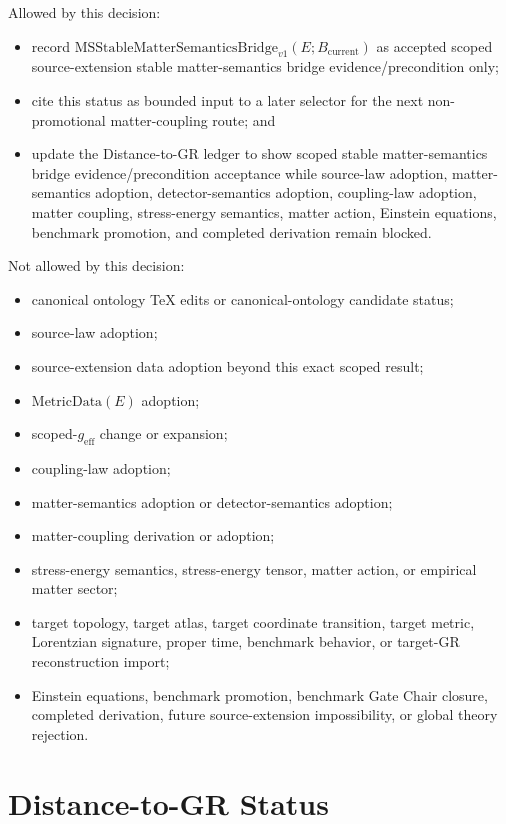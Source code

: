 \documentclass[11pt]{article}
\newcommand{\Bcur}{B_{\mathrm{current}}}
\newcommand{\MSBridge}{\mathrm{MSStableMatterSemanticsBridge}_{v1}}
\newcommand{\MetricData}{\mathrm{MetricData}}
\newcommand{\geff}{g_{\mathrm{eff}}}
\begin{document}
Allowed by this decision:
\begin{itemize}[leftmargin=*]
  \item record \(\MSBridge(E;\Bcur)\) as accepted scoped source-extension
  stable matter-semantics bridge evidence/precondition only;
  \item cite this status as bounded input to a later selector for the next
  non-promotional matter-coupling route; and
  \item update the Distance-to-GR ledger to show scoped stable
  matter-semantics bridge evidence/precondition acceptance while source-law
  adoption, matter-semantics adoption, detector-semantics adoption,
  coupling-law adoption, matter coupling, stress-energy semantics, matter
  action, Einstein equations, benchmark promotion, and completed derivation
  remain blocked.
\end{itemize}

Not allowed by this decision:
\begin{itemize}[leftmargin=*]
  \item canonical ontology TeX edits or canonical-ontology candidate status;
  \item source-law adoption;
  \item source-extension data adoption beyond this exact scoped result;
  \item \(\MetricData(E)\) adoption;
  \item scoped-\(\geff\) change or expansion;
  \item coupling-law adoption;
  \item matter-semantics adoption or detector-semantics adoption;
  \item matter-coupling derivation or adoption;
  \item stress-energy semantics, stress-energy tensor, matter action, or
  empirical matter sector;
  \item target topology, target atlas, target coordinate transition, target
  metric, Lorentzian signature, proper time, benchmark behavior, or target-GR
  reconstruction import;
  \item Einstein equations, benchmark promotion, benchmark Gate Chair closure,
  completed derivation, future source-extension impossibility, or global
  theory rejection.
\end{itemize}

\section{Distance-to-GR Status}
\end{document}

